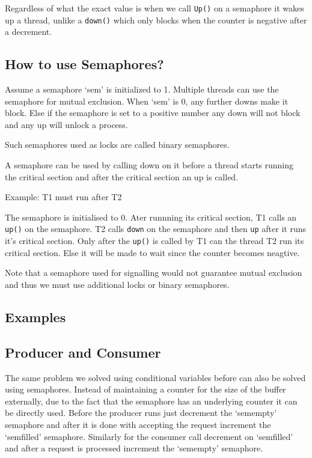 \documentclass[12pt]{article}
\begin{document}
Regardless of what the exact value is when we call \texttt{Up()} on a semaphore it wakes up a thread, unlike a \texttt{down()} which 
only blocks when the counter is negative after a decrement. 

\subsection{How to use Semaphores?}
Assume a semaphore `sem' is initialized to 1. Multiple threads can use the semaphore for mutual exclusion. When `sem' is 0, any 
further downs make it block. Else if the semaphore is set to a positive number any down will not block and any up will unlock a process. 

Such semaphores used as locks are called binary semaphores. 


A semaphore can be used by calling down on it before a thread starts running the critical section and after the critical section an up is called.

Example:  T1 must run after T2

The semaphore is initialised to 0. Ater runnning its critical section, T1 calls an \texttt{up()} on the semaphore. T2 calls \texttt{down} on the semaphore and then \texttt{up} after it runs it's critical section. 
Only after the \texttt{up()} is called by T1 can the thread T2 run its critical section. Else it will be made to wait since the counter becomes neagtive. 

Note that a semaphore used for signalling would not guarantee mutual exclusion and thus we must use additional locks or binary semaphores. 
\subsection{Examples}
\subsection*{Producer and Consumer}
The same problem we solved using conditional variables before can also be solved using semaphores.
Instead of maintaining a counter for the size of the buffer externally, due to the fact that the semaphore has an underlying counter it can be directly used. 
Before the producer runs just decrement the `semempty' semaphore and after it is done with accepting the request increment the `semfilled' semaphore. 
Similarly for the consumer call decrement on `semfilled' and after a request is processed increment the `semempty' semaphore.
\end{document}
